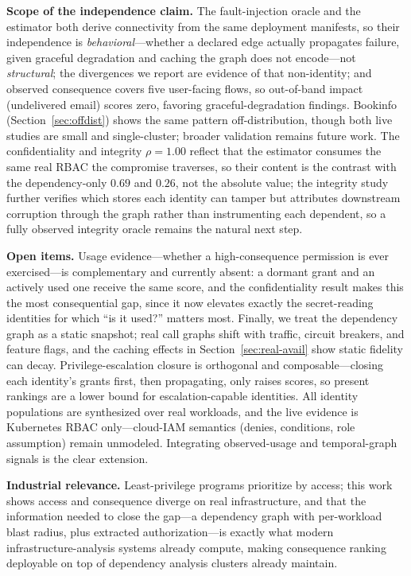 \documentclass[conference]{IEEEtran}
\begin{document}
\textbf{Scope of the independence claim.} The fault-injection oracle and the estimator
both derive connectivity from the same deployment manifests, so their independence is
\emph{behavioral}---whether a declared edge actually propagates failure, given graceful
degradation and caching the graph does not encode---not \emph{structural}; the
divergences we report are evidence of that non-identity; and observed consequence covers five
user-facing flows, so out-of-band impact (undelivered email) scores zero, favoring
graceful-degradation findings. Bookinfo (Section~\ref{sec:offdist}) shows the same pattern off-distribution, though
both live studies are small and single-cluster; broader validation remains future work. The confidentiality and integrity
$\rho=1.00$ reflect that the estimator consumes the same real RBAC the compromise
traverses, so their content is the contrast with the dependency-only $0.69$ and $0.26$,
not the absolute value; the integrity study further verifies which stores each identity
can tamper but attributes downstream corruption through the graph rather than
instrumenting each dependent, so a fully observed integrity oracle remains the natural
next step.

\textbf{Open items.} Usage evidence---whether a high-consequence permission is ever
exercised---is complementary and currently absent: a dormant grant and an actively
used one receive the same score, and the confidentiality result makes this the most
consequential gap, since it now elevates exactly the secret-reading identities for
which ``is it used?'' matters most. Finally, we treat the dependency graph as a
static snapshot; real call graphs shift with traffic, circuit breakers, and feature
flags, and the caching effects in Section~\ref{sec:real-avail} show static fidelity
can decay. Privilege-escalation closure is orthogonal and composable---closing each
identity's grants first, then propagating, only raises scores, so present rankings
are a lower bound for escalation-capable identities. All identity populations are
synthesized over real workloads, and the live evidence is Kubernetes RBAC
only---cloud-IAM semantics (denies, conditions, role assumption) remain unmodeled.
Integrating observed-usage and temporal-graph signals is the clear extension.

\textbf{Industrial relevance.} Least-privilege programs prioritize by access; this work
shows access and consequence diverge on real infrastructure, and that the information
needed to close the gap---a dependency graph with per-workload blast radius, plus
extracted authorization---is exactly what modern infrastructure-analysis systems already
compute, making consequence ranking deployable on top of dependency analysis clusters
already maintain.
\end{document}
